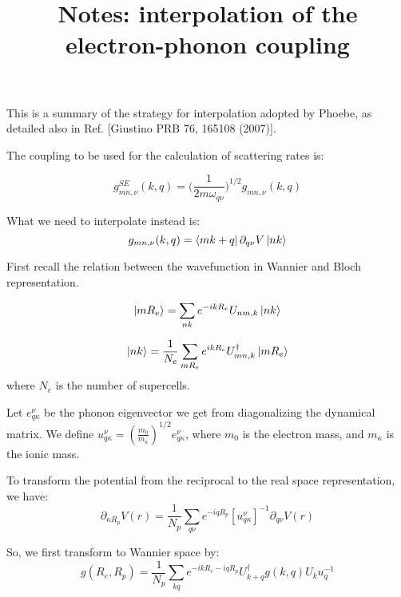 \documentclass[singlecolumn,english,aps,prl,showpacs,floatfix,superscriptaddress,notitlepage]{revtex4-1}
\begin{document}
\title{Notes: interpolation of the electron-phonon coupling}
 
\maketitle

This is a summary of the strategy for interpolation adopted by Phoebe, as detailed also in Ref. [Giustino PRB  76, 165108 (2007)].

The coupling to be used for the calculation of scattering rates is:

\begin{equation}
g^{SE}_{mn,\nu} (k,q) = \bigg( \frac{1}{2 m \omega_{q\nu}} \bigg)^{1/2} g_{mn,\nu} (k,q)
\end{equation}

What we need to interpolate instead is:
\begin{equation}
g_{mn,\nu} (k,q) = \bra{mk+q} \partial_{q\nu}V \ket{nk}
\end{equation}

First recall the relation between the wavefunction in Wannier and Bloch representation.

\begin{equation}
\ket{mR_e} = \sum_{nk} e^{-ikR_e} U_{nm,k} \ket{nk}
\end{equation}

\begin{equation}
\ket{nk} = \frac{1}{N_e} \sum_{mR_e} e^{ikR_e} U_{mn,k}^\dagger \ket{mR_e}
\end{equation}
where $N_e$ is the number of supercells.



Let $e_{q\kappa}^{\nu}$ be the phonon eigenvector we get from diagonalizing the dynamical matrix.
We define $u_{q\kappa}^{\nu} = (\frac{m_0}{m_{\kappa}})^{1/2} e_{q\kappa}^{\nu}$, where $m_0$ is the electron mass, and $m_{\kappa}$ is the ionic mass.

To transform the potential from the reciprocal to the real space representation, we have:
\begin{equation}
\partial_{\kappa R_p} V(r)
=
\frac{1}{N_p}
\sum_{q\nu} e^{-iqR_p} [u_{q\kappa}^{\nu}]^{-1} \partial_{q\nu} V(r)
\end{equation}


So, we first transform to Wannier space by:
\begin{equation}
g(R_e,R_p)
=
\frac{1}{N_p}
\sum_{kq} e^{-ikR_e-iqR_p} U_{k+q}^\dagger g(k,q) U_k u_q^{-1}
\end{equation}
\end{document}
